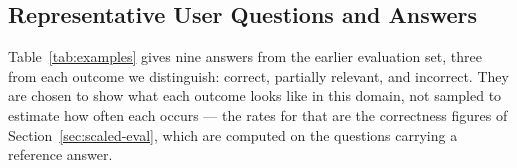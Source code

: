 \documentclass[acmsmall,review,anonymous,screen]{acmart}
\begin{document}
\begin{table}[h]
\centering
\caption{Highest-Scoring Learned Terms}
\label{tab:learned_terms}
\end{table}

\subsection{Representative User Questions and Answers}

Table~\ref{tab:examples} gives nine answers from the earlier evaluation set,
three from each outcome we distinguish: correct, partially relevant, and
incorrect. They are chosen to show what each outcome looks like in this domain,
not sampled to estimate how often each occurs --- the rates for that are the
correctness figures of Section~\ref{sec:scaled-eval}, which are computed on the
questions carrying a reference answer.
\end{document}
